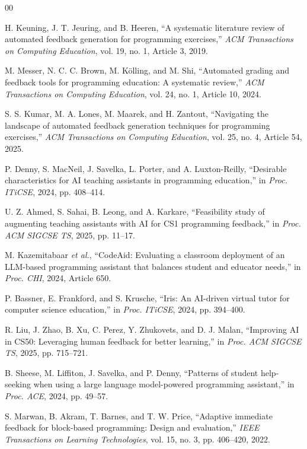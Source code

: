 \documentclass[conference]{IEEEtran}
\begin{document}
\begin{thebibliography}{00}

H. Keuning, J. T. Jeuring, and B. Heeren, ``A systematic literature review of automated feedback generation for programming exercises,'' \emph{ACM Transactions on Computing Education}, vol. 19, no. 1, Article 3, 2019.

M. Messer, N. C. C. Brown, M. K{\"o}lling, and M. Shi, ``Automated grading and feedback tools for programming education: A systematic review,'' \emph{ACM Transactions on Computing Education}, vol. 24, no. 1, Article 10, 2024.

S. S. Kumar, M. A. Lones, M. Maarek, and H. Zantout, ``Navigating the landscape of automated feedback generation techniques for programming exercises,'' \emph{ACM Transactions on Computing Education}, vol. 25, no. 4, Article 54, 2025.

P. Denny, S. MacNeil, J. Savelka, L. Porter, and A. Luxton-Reilly, ``Desirable characteristics for AI teaching assistants in programming education,'' in \emph{Proc. ITiCSE}, 2024, pp. 408--414.

U. Z. Ahmed, S. Sahai, B. Leong, and A. Karkare, ``Feasibility study of augmenting teaching assistants with AI for CS1 programming feedback,'' in \emph{Proc. ACM SIGCSE TS}, 2025, pp. 11--17.

M. Kazemitabaar \emph{et al.}, ``CodeAid: Evaluating a classroom deployment of an LLM-based programming assistant that balances student and educator needs,'' in \emph{Proc. CHI}, 2024, Article 650.

P. Bassner, E. Frankford, and S. Krusche, ``Iris: An AI-driven virtual tutor for computer science education,'' in \emph{Proc. ITiCSE}, 2024, pp. 394--400.

R. Liu, J. Zhao, B. Xu, C. Perez, Y. Zhukovets, and D. J. Malan, ``Improving AI in CS50: Leveraging human feedback for better learning,'' in \emph{Proc. ACM SIGCSE TS}, 2025, pp. 715--721.

B. Sheese, M. Liffiton, J. Savelka, and P. Denny, ``Patterns of student help-seeking when using a large language model-powered programming assistant,'' in \emph{Proc. ACE}, 2024, pp. 49--57.

S. Marwan, B. Akram, T. Barnes, and T. W. Price, ``Adaptive immediate feedback for block-based programming: Design and evaluation,'' \emph{IEEE Transactions on Learning Technologies}, vol. 15, no. 3, pp. 406--420, 2022.


\end{thebibliography}
\end{document}
